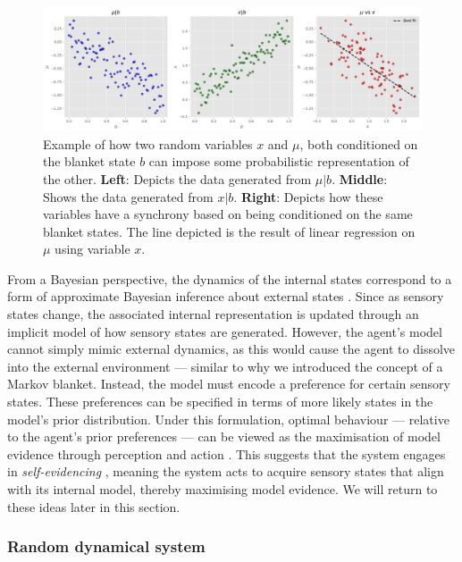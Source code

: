 \documentclass{article}
\begin{document}
\begin{figure}[htbp]
    \centering
    \includegraphics[scale=0.4]{images/blanket_prob_relation.png}
    \caption{Example of how two random variables $x$ and $\mu$, both conditioned on the blanket state $b$ can impose some probabilistic representation of the other. \textbf{Left}: Depicts the data generated from $\mu|b$. \textbf{Middle}: Shows the data generated from $x|b$. \textbf{Right}: Depicts how these variables have a synchrony based on being conditioned on the same blanket states. The line depicted is the result of linear regression on $\mu$ using variable $x$.}
    \label{fig:markov_blanket_prob_relation}
\end{figure}


From a Bayesian perspective, the dynamics of the internal states correspond to a form of approximate Bayesian inference about external states \citep{parr2022ActiveInference}. Since as sensory states change, the associated internal representation is updated through an implicit model of how sensory states are generated. However, the agent’s model cannot simply mimic external dynamics, as this would cause the agent to dissolve into the external environment — similar to why we introduced the concept of a Markov blanket. Instead, the model must encode a preference for certain sensory states. These preferences can be specified in terms of more likely states in the model’s prior distribution. Under this formulation, optimal behaviour — relative to the agent's prior preferences — can be viewed as the maximisation of model evidence through perception and action \citep{parr2022ActiveInference}. This suggests that the system engages in \textit{self-evidencing} \citep{hohwy2016evidencing}, meaning the system acts to acquire sensory states that align with its internal model, thereby maximising model evidence. We will return to these ideas later in this section. 


\subsubsection{Random dynamical system}
\end{document}
